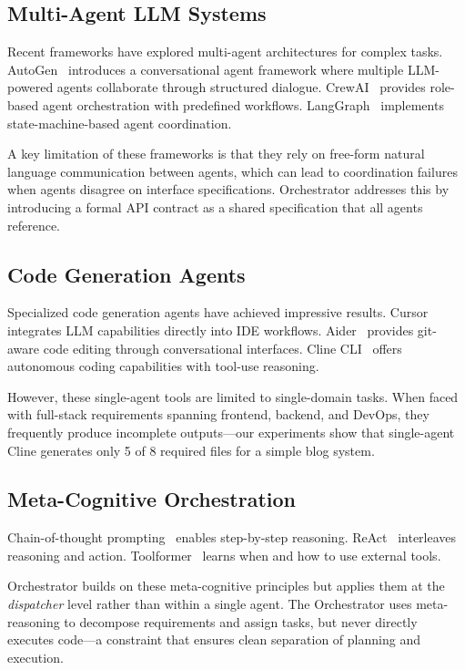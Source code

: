 \documentclass[12pt]{article}
\begin{document}
\subsection{Multi-Agent LLM Systems}

Recent frameworks have explored multi-agent architectures for complex tasks. AutoGen~\cite{autogen} introduces a conversational agent framework where multiple LLM-powered agents collaborate through structured dialogue. CrewAI~\cite{crewai} provides role-based agent orchestration with predefined workflows. LangGraph~\cite{langgraph} implements state-machine-based agent coordination.

A key limitation of these frameworks is that they rely on free-form natural language communication between agents, which can lead to coordination failures when agents disagree on interface specifications. Orchestrator addresses this by introducing a formal API contract as a shared specification that all agents reference.

\subsection{Code Generation Agents}

Specialized code generation agents have achieved impressive results. Cursor~\cite{cursor} integrates LLM capabilities directly into IDE workflows. Aider~\cite{aider} provides git-aware code editing through conversational interfaces. Cline CLI~\cite{cline} offers autonomous coding capabilities with tool-use reasoning.

However, these single-agent tools are limited to single-domain tasks. When faced with full-stack requirements spanning frontend, backend, and DevOps, they frequently produce incomplete outputs---our experiments show that single-agent Cline generates only 5 of 8 required files for a simple blog system.

\subsection{Meta-Cognitive Orchestration}

Chain-of-thought prompting~\cite{wei2022} enables step-by-step reasoning. ReAct~\cite{yao2023} interleaves reasoning and action. Toolformer~\cite{schick2023} learns when and how to use external tools.

Orchestrator builds on these meta-cognitive principles but applies them at the \emph{dispatcher} level rather than within a single agent. The Orchestrator uses meta-reasoning to decompose requirements and assign tasks, but never directly executes code---a constraint that ensures clean separation of planning and execution.
\end{document}
